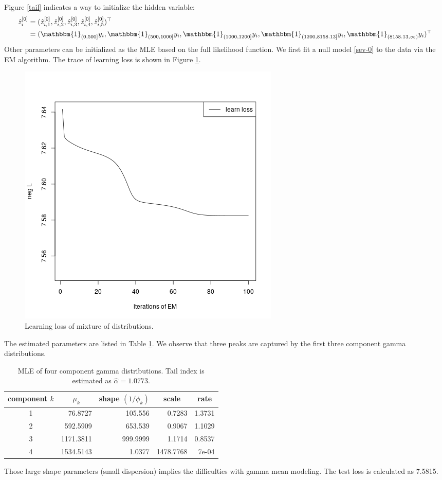 \documentclass[11pt]{article}
\numberwithin{equation}{section}
\begin{document}
	Figure \ref{tail} indicates a way to initialize the hidden variable:
	\begin{equation}
		\begin{aligned}
			\hat{z}^{[0]}_i&=(\hat{z}^{[0]}_{i,1},\hat{z}^{[0]}_{i,2},\hat{z}^{[0]}_{i,3},\hat{z}^{[0]}_{i,4},\hat{z}^{[0]}_{i,5})^\top\\
			&=(\mathbbm{1}_{(0,500]}y_i,\mathbbm{1}_{(500, 1000]}y_i,\mathbbm{1}_{(1000,1200]}y_i,\mathbbm{1}_{(1200,8158.13]}y_i,\mathbbm{1}_{(8158.13,\infty)}y_i)^\top
		\end{aligned}
	\end{equation}
	Other parameters can be initialized as the MLE based on the full likelihood function.
We first fit a null model \eqref{sev-0} to the data via the EM algorithm. 
The trace of learning loss is shown in Figure \ref{null_sev}.
	\begin{figure}[h!]
		\centering
		\includegraphics[width=0.5\linewidth]{../plots/sev/null_trace}
		\caption{Learning loss of mixture of distributions.}\label{null_sev}
	\end{figure}
The estimated parameters are listed in Table \ref{null-gamma}. We observe that three peaks are captured by the first three component gamma distributions.
	\begin{table}[h!]
		\centering
		\caption{MLE of four component gamma distributions. Tail index is estimated as $\hat{\alpha}=1.0773$.}\label{null-gamma}
		\begin{tabular}{crrrr}
			\hline
			component $k$ & \multicolumn{1}{c}{$\mu_k$} & \multicolumn{1}{c}{shape $(1/\phi_k)$} & \multicolumn{1}{c}{scale} & \multicolumn{1}{c}{rate} \\ \hline
			1         & 76.8727                & 105.556                   & 0.7283                    & 1.3731                   \\
			2         & 592.5909               & 653.539                   & 0.9067                    & 1.1029                   \\
			3         & 1171.3811              & 999.9999                  & 1.1714                    & 0.8537                   \\
			4         & 1534.5143              & 1.0377                    & 1478.7768                 & 7e-04                    \\ \hline
		\end{tabular}
	\end{table}
	Those large shape parameters (small dispersion) implies the  difficulties with {gamma mean modeling}. The test loss is calculated as 7.5815.
\end{document}

